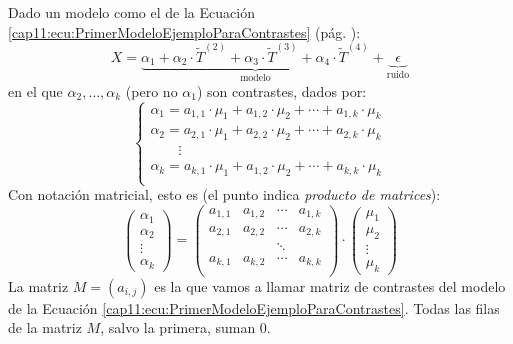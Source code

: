 Dado un modelo como el de la Ecuación \ref{cap11:ecu:PrimerModeloEjemploParaContrastes} (pág. \pageref{cap11:ecu:PrimerModeloEjemploParaContrastes}):
\[
X= \underbrace{\alpha_1 + \alpha_2\cdot \tilde{T}^{(2)}+\alpha_3\cdot \tilde{T}^{(3)}+\alpha_4\cdot \tilde{T}^{(4)}}_{\mbox{modelo}} +\underbrace{\phantom{1}\epsilon\phantom{1}}_{\mbox{ruido}}
\]
en el que $\alpha_2,\ldots,\alpha_k$ (pero no $\alpha_1$) son contrastes, dados por:
\[
\begin{cases}
\alpha_1 = a_{1,1}\cdot\mu_1+a_{1,2}\cdot\mu_2+\cdots+a_{1,k}\cdot\mu_k\\
\alpha_2 = a_{2,1}\cdot\mu_1+a_{2,2}\cdot\mu_2+\cdots+a_{2,k}\cdot\mu_k\\
\quad\quad \vdots\\
\alpha_k = a_{k,1}\cdot\mu_1+a_{1,2}\cdot\mu_2+\cdots+a_{k,k}\cdot\mu_k\\
\end{cases}
\]
Con notación matricial, esto es (el punto indica {\em producto de matrices}):
\[
\left(
\begin{array}{c}
\alpha_1\\\alpha_2\\\vdots\\\alpha_k
\end{array}
\right)
=
\left(
\begin{array}{cccc}
a_{1,1}&a_{1,2}&\cdots&a_{1,k}\\
a_{2,1}&a_{2,2}&\cdots&a_{2,k}\\
&&\ddots&\\
a_{k,1}&a_{k,2}&\cdots&a_{k,k}\\
\end{array}
\right)
\cdot
\left(
\begin{array}{c}
\mu_1\\\mu_2\\\vdots\\\mu_k
\end{array}
\right)
\]
La matriz $M=(a_{i,j})$ es la que vamos a llamar {\sf matriz de contrastes} del modelo de la Ecuación \ref{cap11:ecu:PrimerModeloEjemploParaContrastes}. Todas las filas de la matriz $M$, salvo la primera, suman $0$.

